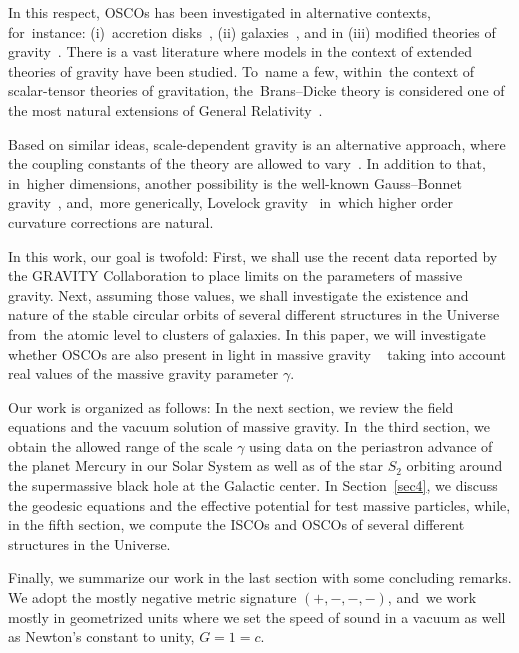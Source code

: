 \documentclass[aps,amsmath,amssymb,twocolumn]{revtex4}
\begin{document}
In this respect, OSCOs has been investigated in alternative contexts, for~instance: (i)~accretion disks~\cite{Rezzolla:2003re,Stuchlik:2008dv}, (ii) galaxies~\cite{Stuchlik:2011zz,Sarkar:2014cca}, and  in (iii) modified theories of gravity~\cite{Perez:2012bx,Lee:2017fbq}.
There is a vast literature where models in the context of extended theories of gravity have been studied. To~name a few, within~the context of scalar-tensor theories of gravitation, the~Brans--Dicke theory is considered one of the most natural extensions of General Relativity~\cite{Brans:1961sx,Brans:1962zz,Dicke:1961gz}. 

Based on similar ideas, scale-dependent gravity is an alternative approach, where the coupling constants of the theory are allowed to vary~\cite{SD1,SD0,SD2,SD3,SD4,SD5,SD6,SD7,SD8,SD9,SD10,SD14,SD15,SD16,astro1,astro2,cosmo1,cosmo2}.
In addition to that, in~higher dimensions, another possibility is the well-known Gauss–Bonnet gravity~\cite{Cai:2001dz}, and,~more generically,  Lovelock gravity~\cite{Lovelock:1971yv} in~which higher order curvature corrections are natural.
%

In this work, our goal is twofold: First, we shall use the recent data reported by the GRAVITY Collaboration to place limits on the parameters of massive gravity. Next, assuming those values, we shall investigate the existence and nature of the stable circular orbits of several different structures in the Universe from~the atomic level to  clusters of galaxies.
%
In this paper, we will investigate whether OSCOs are also present in light in massive gravity
~\cite{deRham:2010kj,Panpanich:2018cxo} taking into account real values of the massive gravity parameter $\gamma$.

Our work is organized as follows: In the next section, we review the field equations and the vacuum solution of massive gravity. In~the third section, we obtain the allowed range of the scale $\gamma$ using data on the periastron advance of the planet Mercury in our Solar System as well as of the star $S_2$ orbiting around the supermassive black hole at the Galactic center. In Section~\ref{sec4}, we discuss the geodesic equations and the effective potential for test massive particles, while, in the fifth section, we compute the ISCOs and OSCOs of several different structures in the Universe. 

Finally, we summarize our work in the last section with some concluding remarks. We adopt the mostly negative metric signature $(+,-,-,-)$, and~we work mostly in geometrized units where we set the speed of sound in a vacuum as well as Newton's constant to unity, $G=1=c$.
\end{document}
